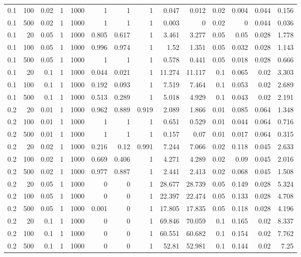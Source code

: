 \begin{table}[!htbp]
\begin{tabular}{lrrrrrrrrrrrrr}
0.1 & 100 & 0.02 & 1 & 1000 & 1 & 1 & 1 & 0.047 & 0.012 & 0.02 & 0.004 & 0.044 & 0.156 \\
0.1 & 500 & 0.02 & 1 & 1000 & 1 & 1 & 1 & 0.003 & 0 & 0.02 & 0 & 0.044 & 0.036 \\
0.1 & 20 & 0.05 & 1 & 1000 & 0.805 & 0.617 & 1 & 3.461 & 3.277 & 0.05 & 0.05 & 0.028 & 1.778 \\
0.1 & 100 & 0.05 & 1 & 1000 & 0.996 & 0.974 & 1 & 1.52 & 1.351 & 0.05 & 0.032 & 0.028 & 1.143 \\
0.1 & 500 & 0.05 & 1 & 1000 & 1 & 1 & 1 & 0.578 & 0.441 & 0.05 & 0.018 & 0.028 & 0.666 \\
0.1 & 20 & 0.1 & 1 & 1000 & 0.044 & 0.021 & 1 & 11.274 & 11.117 & 0.1 & 0.065 & 0.02 & 3.303 \\
0.1 & 100 & 0.1 & 1 & 1000 & 0.192 & 0.093 & 1 & 7.519 & 7.464 & 0.1 & 0.053 & 0.02 & 2.689 \\
0.1 & 500 & 0.1 & 1 & 1000 & 0.513 & 0.289 & 1 & 5.018 & 4.929 & 0.1 & 0.043 & 0.02 & 2.191 \\
0.2 & 20 & 0.01 & 1 & 1000 & 0.962 & 0.889 & 0.919 & 2.089 & 1.866 & 0.01 & 0.085 & 0.064 & 1.348 \\
0.2 & 100 & 0.01 & 1 & 1000 & 1 & 1 & 1 & 0.651 & 0.529 & 0.01 & 0.044 & 0.064 & 0.716 \\
0.2 & 500 & 0.01 & 1 & 1000 & 1 & 1 & 1 & 0.157 & 0.07 & 0.01 & 0.017 & 0.064 & 0.315 \\
0.2 & 20 & 0.02 & 1 & 1000 & 0.216 & 0.12 & 0.991 & 7.244 & 7.066 & 0.02 & 0.118 & 0.045 & 2.633 \\
0.2 & 100 & 0.02 & 1 & 1000 & 0.669 & 0.406 & 1 & 4.271 & 4.289 & 0.02 & 0.09 & 0.045 & 2.016 \\
0.2 & 500 & 0.02 & 1 & 1000 & 0.977 & 0.887 & 1 & 2.441 & 2.413 & 0.02 & 0.068 & 0.045 & 1.508 \\
0.2 & 20 & 0.05 & 1 & 1000 & 0 & 0 & 1 & 28.677 & 28.739 & 0.05 & 0.149 & 0.028 & 5.324 \\
0.2 & 100 & 0.05 & 1 & 1000 & 0 & 0 & 1 & 22.397 & 22.474 & 0.05 & 0.133 & 0.028 & 4.708 \\
0.2 & 500 & 0.05 & 1 & 1000 & 0.001 & 0 & 1 & 17.805 & 17.835 & 0.05 & 0.118 & 0.028 & 4.196 \\
0.2 & 20 & 0.1 & 1 & 1000 & 0 & 0 & 1 & 69.846 & 70.059 & 0.1 & 0.165 & 0.02 & 8.337 \\
0.2 & 100 & 0.1 & 1 & 1000 & 0 & 0 & 1 & 60.551 & 60.682 & 0.1 & 0.154 & 0.02 & 7.762 \\
0.2 & 500 & 0.1 & 1 & 1000 & 0 & 0 & 1 & 52.81 & 52.981 & 0.1 & 0.144 & 0.02 & 7.25 \\

\end{tabular}
\end{table}
